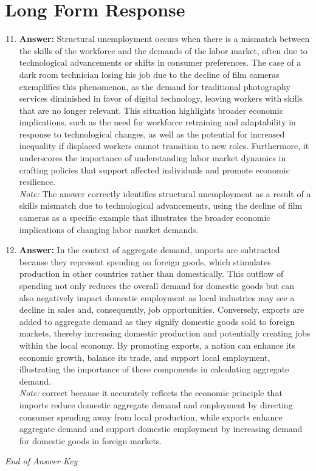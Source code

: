 \documentclass[12pt]{article}
\begin{document}
\section*{Long Form Response}
\begin{enumerate}[label=\arabic*.]
\setcounter{enumi}{10}
\item \textbf{Answer:} Structural unemployment occurs when there is a mismatch between the skills of the workforce and the demands of the labor market, often due to technological advancements or shifts in consumer preferences. The case of a dark room technician losing his job due to the decline of film cameras exemplifies this phenomenon, as the demand for traditional photography services diminished in favor of digital technology, leaving workers with skills that are no longer relevant. This situation highlights broader economic implications, such as the need for workforce retraining and adaptability in response to technological changes, as well as the potential for increased inequality if displaced workers cannot transition to new roles. Furthermore, it underscores the importance of understanding labor market dynamics in crafting policies that support affected individuals and promote economic resilience.
\\ \textit{Note:} The answer correctly identifies structural unemployment as a result of a skills mismatch due to technological advancements, using the decline of film cameras as a specific example that illustrates the broader economic implications of changing labor market demands.
\item \textbf{Answer:} In the context of aggregate demand, imports are subtracted because they represent spending on foreign goods, which stimulates production in other countries rather than domestically. This outflow of spending not only reduces the overall demand for domestic goods but can also negatively impact domestic employment as local industries may see a decline in sales and, consequently, job opportunities. Conversely, exports are added to aggregate demand as they signify domestic goods sold to foreign markets, thereby increasing domestic production and potentially creating jobs within the local economy. By promoting exports, a nation can enhance its economic growth, balance its trade, and support local employment, illustrating the importance of these components in calculating aggregate demand.
\\ \textit{Note:} correct because it accurately reflects the economic principle that imports reduce domestic aggregate demand and employment by directing consumer spending away from local production, while exports enhance aggregate demand and support domestic employment by increasing demand for domestic goods in foreign markets.
\end{enumerate}

\vfill
\noindent\textit{End of Answer Key}
\end{document}
